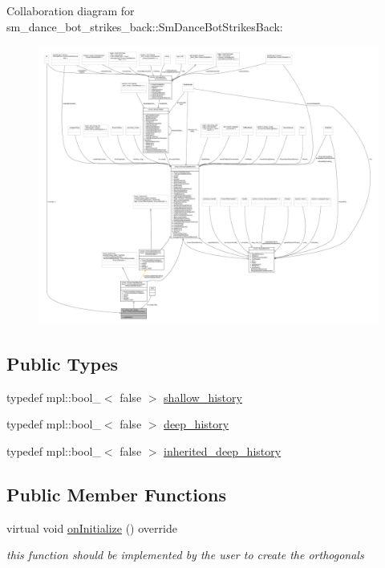 Collaboration diagram for sm\+\_\+dance\+\_\+bot\+\_\+strikes\+\_\+back\+:\+:Sm\+Dance\+Bot\+Strikes\+Back\+:
\nopagebreak
\begin{figure}[H]
\begin{center}
\leavevmode
\includegraphics[width=350pt]{structsm__dance__bot__strikes__back_1_1SmDanceBotStrikesBack__coll__graph}
\end{center}
\end{figure}
\subsection*{Public Types}
\begin{DoxyCompactItemize}
\item 
typedef mpl\+::bool\+\_\+$<$ false $>$ \hyperlink{structsm__dance__bot__strikes__back_1_1SmDanceBotStrikesBack_a193a12436ca97e49e143e642f314656b}{shallow\+\_\+history}
\item 
typedef mpl\+::bool\+\_\+$<$ false $>$ \hyperlink{structsm__dance__bot__strikes__back_1_1SmDanceBotStrikesBack_a3192d4079cbcf0739c7002538767ad22}{deep\+\_\+history}
\item 
typedef mpl\+::bool\+\_\+$<$ false $>$ \hyperlink{structsm__dance__bot__strikes__back_1_1SmDanceBotStrikesBack_aca174eb9bc9f50083f00b8bb1946fb6b}{inherited\+\_\+deep\+\_\+history}
\end{DoxyCompactItemize}
\subsection*{Public Member Functions}
\begin{DoxyCompactItemize}
\item 
virtual void \hyperlink{structsm__dance__bot__strikes__back_1_1SmDanceBotStrikesBack_ad6a9ef45cc05cb6fed4550f2f04d4a3e}{on\+Initialize} () override
\begin{DoxyCompactList}\small\item\em this function should be implemented by the user to create the orthogonals \end{DoxyCompactList}\end{DoxyCompactItemize}
